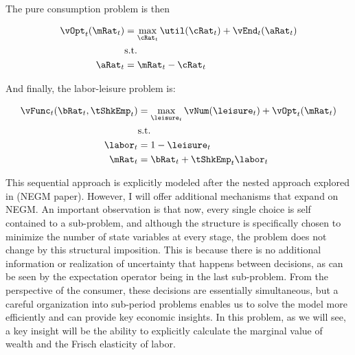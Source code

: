 \documentclass[\econtexRoot/EGMN]{subfiles}
\begin{document}
The pure consumption problem is then

\begin{equation}
    \begin{split}
        \vOpt_{t}(\mRat_{t}) & = \max_{\cRat_{t}} \util(\cRat_{t}) + \vEnd_{t}(\aRat_{t}) \\
        & \text{s.t.} \\
        \aRat_{t} & = \mRat_{t} - \cRat_{t}
    \end{split}
\end{equation}

And finally, the labor-leisure problem is:

\begin{equation}
    \begin{split}
        \vFunc_{t}(\bRat_{t}, \tShkEmp_{t}) & = \max_{ \leisure_{t}}
        \vNum(\leisure_{t}) + \vOpt_{t} (\mRat_{t}) \\
        & \text{s.t.} \\
        \labor_{t} & = 1 - \leisure_{t} \\
        \mRat_{t} & = \bRat_{t} + \tShkEmp_{t}\labor_{t} \\
    \end{split}
\end{equation}

This sequential approach is explicitly modeled after the nested approach explored in (NEGM paper). However, I will offer additional mechanisms that expand on NEGM. An important observation is that now, every single choice is self contained to a sub-problem, and although the structure is specifically chosen to minimize the number of state variables at every stage, the problem does not change by this structural imposition. This is because there is no additional information or realization of uncertainty that happens between decisions, as can be seen by the expectation operator being in the last sub-problem. From the perspective of the consumer, these decisions are essentially simultaneous, but a careful organization into sub-period problems enables us to solve the model more efficiently and can provide key economic insights. In this problem, as we will see, a key insight will be the ability to explicitly calculate the marginal value of wealth and the Frisch elasticity of labor.
\end{document}
